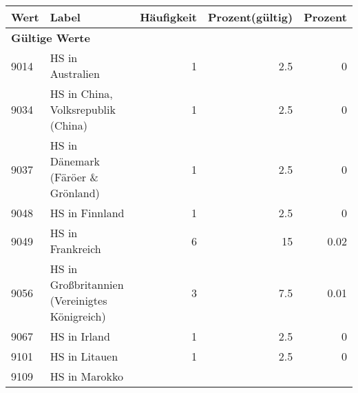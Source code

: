      \begin{longtable}{lXrrr}
     \toprule
     \textbf{Wert} & \textbf{Label} & \textbf{Häufigkeit} & \textbf{Prozent(gültig)} & \textbf{Prozent} \\
     \endhead
     \midrule
     \multicolumn{5}{l}{\textbf{Gültige Werte}}\\
        9014 & \multicolumn{1}{X}{HS in Australien} & %
          \num{1} &
          \num[round-mode=places,round-precision=2]{2,5} &
          \num[round-mode=places,round-precision=2]{0} \\
        9034 & \multicolumn{1}{X}{HS in China, Volksrepublik (China)} & %
          \num{1} &
          \num[round-mode=places,round-precision=2]{2,5} &
          \num[round-mode=places,round-precision=2]{0} \\
        9037 & \multicolumn{1}{X}{HS in Dänemark (Färöer \& Grönland)} & %
          \num{1} &
          \num[round-mode=places,round-precision=2]{2,5} &
          \num[round-mode=places,round-precision=2]{0} \\
        9048 & \multicolumn{1}{X}{HS in Finnland} & %
          \num{1} &
          \num[round-mode=places,round-precision=2]{2,5} &
          \num[round-mode=places,round-precision=2]{0} \\
        9049 & \multicolumn{1}{X}{HS in Frankreich} & %
          \num{6} &
          \num[round-mode=places,round-precision=2]{15} &
          \num[round-mode=places,round-precision=2]{0,02} \\
        9056 & \multicolumn{1}{X}{HS in Großbritannien (Vereinigtes Königreich)} & %
          \num{3} &
          \num[round-mode=places,round-precision=2]{7,5} &
          \num[round-mode=places,round-precision=2]{0,01} \\
        9067 & \multicolumn{1}{X}{HS in Irland} & %
          \num{1} &
          \num[round-mode=places,round-precision=2]{2,5} &
          \num[round-mode=places,round-precision=2]{0} \\
        9101 & \multicolumn{1}{X}{HS in Litauen} & %
          \num{1} &
          \num[round-mode=places,round-precision=2]{2,5} &
          \num[round-mode=places,round-precision=2]{0} \\
        9109 & \multicolumn{1}{X}{HS in Marokko} & %

\end{longtable}
